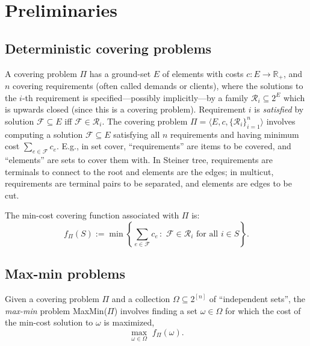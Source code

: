 \documentclass[11pt,letterpaper]{article}
\newcommand{\ignore}[1]{}
\def\f{\ensuremath {\mathcal{F}}\xspace}
\def\cov{\ensuremath{\Pi}\xspace}
\def\mmp{{\sf MaxMin(\cov)}\xspace}
\newcommand{\sse}{\subseteq}
\begin{document}
\ignore{Considering the \emph{average} instead of the worst-case performance gives rise to the well-studied model of
stochastic optimization~\cite{RS04, IKMM04}.  Some common generalizations of the robust and stochastic models have been
considered (see, e.g., Swamy~\cite{Swamy08} and Agrawal et al.~\cite{ADSY09}).}




\section{Preliminaries}
\label{sec:prelim}

\subsection{Deterministic covering problems}

A covering problem \cov has a ground-set $E$ of elements with costs $c:E\rightarrow \mathbb{R}_+$, and $n$ covering
requirements (often called demands or clients), where the solutions to the $i$-th requirement is specified---possibly
implicitly---by a family $\mathcal{R}_i \sse 2^E$ which is upwards closed (since this is a covering problem).
Requirement $i$ is \emph{satisfied} by solution $\f \sse E$ iff $\f\in \mathcal{R}_i$.  The covering problem $\cov =
\langle E,c, \{\mathcal{R}_i\}_{i=1}^n \rangle$ involves computing a solution $\f\sse E$ satisfying all $n$
requirements and having minimum cost $\sum_{e\in \f} c_e$.  E.g., in set cover, ``requirements'' are items to be
covered, and ``elements'' are sets to cover them with. In Steiner tree, requirements are terminals to connect to the
root and elements are the edges; in multicut, requirements are terminal pairs to be separated, and elements are edges
to be cut.

The min-cost covering function associated with \cov is:
$$f_\cov(S) := \min\left\{ \sum_{e\in \f} c_e \,:\,\, \f\in \mathcal{R}_i \mbox{ for all }i\in S\right\}.$$

\subsection{Max-min problems} Given a covering problem $\cov$ and a collection
$\Omega\sse 2^{[n]}$ of ``independent sets'', the {\em max-min} problem \mmp involves finding a set $\omega \in \Omega$
for which the cost of the min-cost solution to $\omega$ is maximized,
$$\max_{\omega\in\Omega}\,\,f_\cov(\omega).$$
\end{document}
